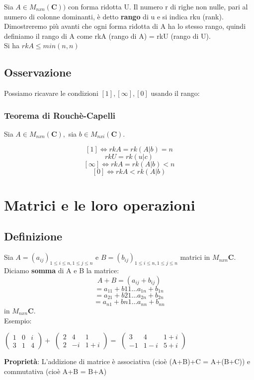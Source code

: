 \documentclass[12pt]{article}
\begin{document}
Sia $A \in M_{nxn} (\mathbf{C}))$ con forma ridotta U. Il numero r di righe non nulle, pari al numero di colonne dominanti, è detto \textbf{rango} di u e si indica rku (rank). Dimostreremo più avanti che ogni forma ridotta di A ha lo stesso rango, quindi definiamo il rango di A come rkA (rango di A) = rkU (rango di U).
\\
Si ha $rkA \le min(n,n)$

\subsection{Osservazione}

Possiamo ricavare le condizioni $[1], [\infty], [0]$  usando il rango:

\subsubsection{Teorema di Rouchè-Capelli}

Sia $A \in M_{nxn} (\mathbf{C}),$ sia $b \in M_{nxi} (\mathbf{C})$.

\[[1] \Longleftrightarrow rkA = rk(A | b) = n\]
\[rkU = rk(u | c)\]
\[[\infty] \Longleftrightarrow rkA = rk(A | b) < n\]
\[[0] \Longleftrightarrow rkA < rk(A | b)\]

\pagebreak

\section{Matrici e le loro operazioni}

\subsection{Definizione}
Sia $A = (a_{ij})_{1 \le i \le n, 1 \le j \le n}$ e $B = (b_{ij})_{1 \le i \le n, 1 \le j \le n}$ matrici in $M_{nxn} \mathbf{C}$.
Diciamo \textbf{somma} di A e B la matrice:
\[A + B = (a_{ij} + b_{ij})\]
\[= a_{11} + b{11} \dots a_{1n} + b_{1n}\]
\[= a_{21} + b{21} \dots a_{2n} + b_{2n}\]
\[= a_{n1} + b{n1} \dots a_{nn} + b_{nn}\]
in $M_{nxn}\mathbf{C}$.
\\
Esempio:

\begin{center}
$\begin{pmatrix}
  1 & 0 & i\\
  3 & 1 & 4
\end{pmatrix} +$
$\begin{pmatrix}
    2 & 4 & 1\\
    2 & -i & 1+i
\end{pmatrix} =$
$\begin{pmatrix}
    3 & 4 & 1+i\\
    -1 & 1-i & 5+i
\end{pmatrix}$
\end{center}
\textbf{Proprietà}: L'addizione di matrice è associativa (cioè (A+B)+C = A+(B+C)) e commutativa (cioè A+B = B+A)
\end{document}
